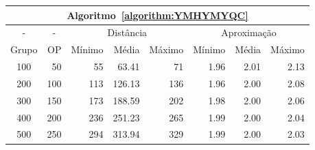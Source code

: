 \begin{table}[!htb]
  \begin{tabular}{|c|r|r|r|r|r|r|r|}
    \hline
    \multicolumn{8}{|c|}{Algoritmo~\ref{algorithm:YMHYMYQC}}                                                                    \\ \hline
      -      & \multicolumn{1}{c|}{-} & \multicolumn{3}{c|}{Distância}             & \multicolumn{3}{c|}{Aproximação}           \\ \hline
    Grupo    & OP                     & Mínimo       & Média        & Máximo       & Mínimo       & Média        & Máximo       \\ \hline  
    100      & 50                     & 55           & 63.41        & 71           & 1.96         & 2.01         & 2.13         \\ \hline
    200      & 100                    & 113          & 126.13       & 136          & 1.96         & 2.00         & 2.08         \\ \hline
    300      & 150                    & 173          & 188.59       & 202          & 1.98         & 2.00         & 2.06         \\ \hline
    400      & 200                    & 236          & 251.23       & 265          & 1.99         & 2.00         & 2.04         \\ \hline
    500      & 250                    & 294          & 313.94       & 329          & 1.99         & 2.00         & 2.03         \\ \hline    
  \end{tabular}
\end{table}